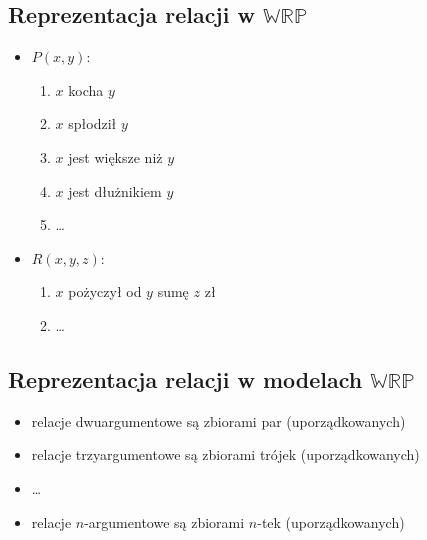\documentclass[12pt]{article}
\newcommand {\WRP} {\ensuremath{\mathbb{WRP}}}
\begin{document}
\subsection{Reprezentacja relacji w \WRP}
%
\begin{itemize}
\item $P(x, y)$:
\begin{enumerate}
\item $x$ kocha $y$
\item $x$ spłodził $y$
\item $x$ jest większe niż $y$
\item $x$ jest dłużnikiem $y$
\item \dots
\end{enumerate}
%
\item $R(x, y, z)$:
\begin{enumerate}
\item  $x$ pożyczył od $y$ sumę $z$ zł
\item \dots
\end{enumerate}
\end{itemize}
%

\subsection{Reprezentacja relacji w modelach \WRP}
%
\begin{itemize}
\item relacje dwuargumentowe są zbiorami par (uporządkowanych)
%
\item relacje trzyargumentowe są zbiorami trójek (uporządkowanych)
%
\item \dots
\item relacje $n$-argumentowe są zbiorami $n$-tek (uporządkowanych)
\end{itemize}
%
\end{document}
